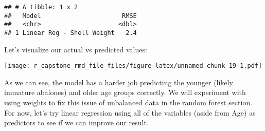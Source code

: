 \documentclass[
]{article}
\newenvironment{Shaded}{\begin{snugshade}}{\end{snugshade}}
\newcommand{\AttributeTok}[1]{\textcolor[rgb]{0.13,0.29,0.53}{#1}}
\newcommand{\CommentTok}[1]{\textcolor[rgb]{0.56,0.35,0.01}{\textit{#1}}}
\newcommand{\DecValTok}[1]{\textcolor[rgb]{0.00,0.00,0.81}{#1}}
\newcommand{\FunctionTok}[1]{\textcolor[rgb]{0.13,0.29,0.53}{\textbf{#1}}}
\newcommand{\NormalTok}[1]{#1}
\newcommand{\OtherTok}[1]{\textcolor[rgb]{0.56,0.35,0.01}{#1}}
\newcommand{\SpecialCharTok}[1]{\textcolor[rgb]{0.81,0.36,0.00}{\textbf{#1}}}
\newcommand{\StringTok}[1]{\textcolor[rgb]{0.31,0.60,0.02}{#1}}
\begin{document}
\begin{verbatim}
## # A tibble: 1 x 2
##   Model                      RMSE
##   <chr>                     <dbl>
## 1 Linear Reg - Shell Weight   2.4
\end{verbatim}

Let's visualize our actual vs predicted values:

\begin{Shaded}
\end{Shaded}

\texttt{[image: r\_capstone\_rmd\_file\_files/figure-latex/unnamed-chunk-19-1.pdf]}

As we can see, the model has a harder job predicting the younger (likely
immature abalones) and older age groups correctly. We will experiment
with using weights to fix this issue of unbalanced data in the random
forest section. For now, let's try linear regression using all of the
variables (aside from Age) as predictors to see if we can improve our
result.
\end{document}
